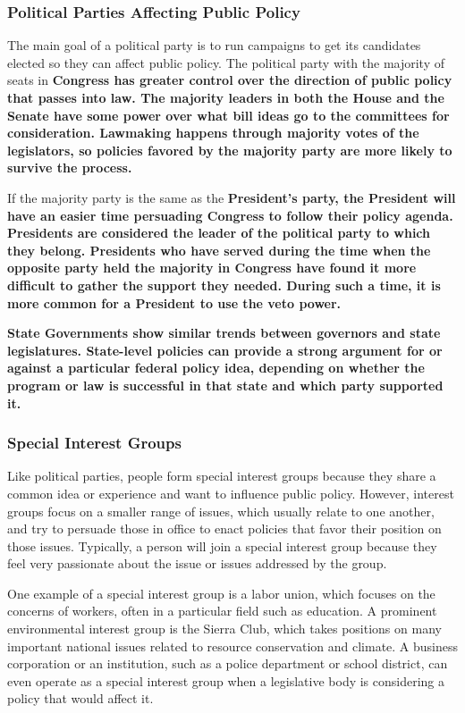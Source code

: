 \subsubsection*{Political Parties Affecting Public Policy}

The main goal of a political party is to run campaigns to get its candidates
elected so they can affect public policy. The political party with the majority
of seats in \bf{Congress} has greater control over the direction of public
policy that passes into law. The majority leaders in both the \bf{House} and the
\bf{Senate} have some power over what bill ideas go to the committees for
consideration. Lawmaking happens through majority votes of the legislators, so
policies favored by the majority party are more likely to survive the process.

If the majority party is the same as the \bf{President's} party, the
\bf{President} will have an easier time persuading \bf{Congress} to follow their
policy agenda. \bf{Presidents} are considered the leader of the political party
to which they belong. Presidents who have served during the time when the
opposite party held the majority in Congress have found it more difficult to
gather the support they needed. During such a time, it is more common for a
\bf{President} to use the veto power.

\bf{State Governments} show similar trends between governors and state
legislatures. State-level policies can provide a strong argument for or against
a particular federal policy idea, depending on whether the program or law is
successful in that state and which party supported it.

\subsubsection*{Special Interest Groups}

Like political parties, people form special interest groups because they share a
common idea or experience and want to influence public policy. However, interest
groups focus on a smaller range of issues, which usually relate to one another,
and try to persuade those in office to enact policies that favor their position
on those issues. Typically, a person will join a special interest group because
they feel very passionate about the issue or issues addressed by the group.

One example of a special interest group is a labor union, which focuses on the
concerns of workers, often in a particular field such as education. A prominent
environmental interest group is the Sierra Club, which takes positions on many
important national issues related to resource conservation and climate. A
business corporation or an institution, such as a police department or school
district, can even operate as a special interest group when a legislative body
is considering a policy that would affect it.

